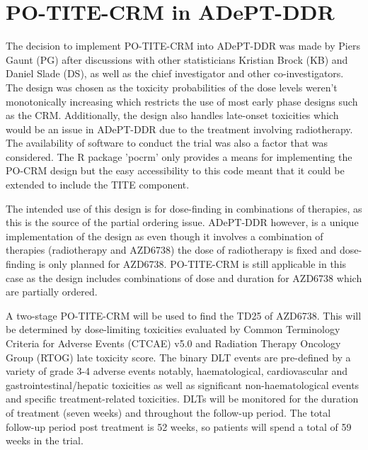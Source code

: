 
\section{PO-TITE-CRM in ADePT-DDR}  
\label{adept:PO-TITE-CRM-in-Adept}

The decision to implement PO-TITE-CRM into ADePT-DDR was made by Piers Gaunt (PG) after discussions with other statisticians Kristian Brock (KB) and Daniel Slade (DS), as well as the chief investigator and other co-investigators. The design was chosen as the toxicity probabilities of the dose levels weren't monotonically increasing which restricts the use of most early phase designs such as the CRM. Additionally, the design also handles late-onset toxicities which would be an issue in ADePT-DDR due to the treatment involving radiotherapy. The availability of software to conduct the trial was also a factor that was considered. The R package 'pocrm' \cite{wagesPocrmRpackagePhase2013} only provides a means for implementing the PO-CRM design but the easy accessibility to this code meant that it could be extended to include the TITE component.  

The intended use of this design is for dose-finding in combinations of therapies, as this is the source of the partial ordering issue. ADePT-DDR however, is a unique implementation of the design as even though it involves a combination of therapies (radiotherapy and AZD6738) the dose of radiotherapy is fixed and dose-finding is only planned for AZD6738. PO-TITE-CRM is still applicable in this case as the design includes combinations of dose and duration for AZD6738 which are partially ordered. 

A two-stage PO-TITE-CRM will be used to find the TD25 of AZD6738. This will be determined by dose-limiting toxicities evaluated by Common Terminology Criteria for Adverse Events (CTCAE) v5.0 and Radiation Therapy Oncology Group (RTOG) late toxicity score. The binary DLT events are pre-defined by a variety of grade 3-4 adverse events notably, haematological, cardiovascular and gastrointestinal/hepatic toxicities as well as significant non-haematological events and specific treatment-related toxicities. DLTs will be monitored for the duration of treatment (seven weeks) and throughout the follow-up period. The total follow-up period post treatment is 52 weeks, so patients will spend a total of 59 weeks in the trial.  

